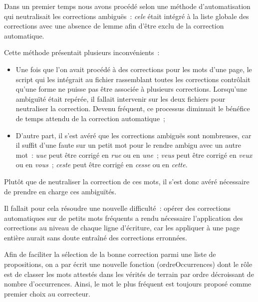\documentclass[a4paper,12pt,twoside]{book}
\begin{document}
				Dans un premier temps nous avons procédé selon une méthode d'automatisation qui neutralisait les corrections ambiguës~: \textit{cele} était intégré à la liste globale des corrections avec une absence de lemme afin d'être exclu de la correction automatique.
				
				Cette méthode présentait plusieurs inconvénients~:

				\begin{itemize}
					\item Une fois que l'on avait procédé à des corrections pour les mots d'une page, le script qui les intégrait au fichier rassemblant toutes les corrections contrôlait qu'une forme ne puisse pas être associée à plusieurs corrections. Lorsqu'une ambiguïté était repérée, il fallait intervenir sur les deux fichiers pour neutraliser la correction. Devenu fréquent, ce processus diminuait le bénéfice de temps attendu de la correction automatique~;

					\item D'autre part, il s'est avéré que les corrections ambiguës sont nombreuses, car il suffit d'une faute sur un petit mot pour le rendre ambigu avec un autre mot~: \textit{uue} peut être corrigé en \textit{rue} ou en \textit{une}~; \textit{veus} peut être corrigé en \textit{veux} ou en \textit{vous}~; \textit{ceste} peut être corrigé en \textit{cesse} ou en \textit{cette}.
				
				\end{itemize}
				
				Plutôt que de neutraliser la correction de ces mots, il s'est donc avéré nécessaire de prendre en charge ces ambiguïtés.
				
				Il fallait pour cela résoudre une nouvelle difficulté~: opérer des corrections automatiques sur de petits mots fréquents a rendu nécessaire l'application des corrections au niveau de chaque ligne d'écriture, car les appliquer à une page entière aurait sans doute entraîné des corrections erronnées.
						
				Afin de faciliter la sélection de la bonne correction parmi une liste de propositions, on a par écrit une nouvelle fonction (\textsf{ordreOccurrences}) dont le rôle est de classer les mots attestés dans les vérités de terrain par ordre décroissant de nombre d'occurrences. Ainsi, le mot le plus fréquent est toujours proposé comme premier choix au correcteur.
			
	\appendix
	
	\renewcommand{\appendixpagename}{Annexes}
	
\end{document}
